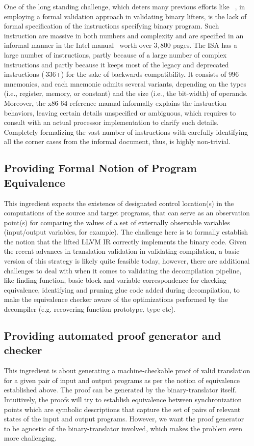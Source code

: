 One of the long standing challenge, which deters many previous efforts like
~\cite{ASE2017}, in employing a formal validation approach in validating
binary lifters, is the lack of formal specification of the \ISA instructions
specifying binary program. Such instruction are massive in both numbers and
complexity and are specified in an informal manner in the Intel
manual~\cite{IntelManual} worth over $3,800$ pages. The \ISA ISA has a large
number of instructions, partly because of a large number of complex
instructions and partly because it keeps most of the legacy and deprecated
instructions ($~336$+) for the sake of backwards compatibility. It consists of
$996$ mnemonics, and each mnemonic admits several variants, depending on the
types (i.e., register, memory, or constant) and the size (i.e., the bit-width)
  of operands. Moreover, the x86-64 reference manual informally explains the
  instruction behaviors, leaving certain details unspecified or ambiguous,
  which requires  to consult with an actual processor implementation to clarify
  such details. Completely formalizing the vast number of instructions with
  carefully identifying all the corner cases from the informal document, thus,
  is highly non-trivial.

\subsection{Providing Formal Notion of Program Equivalence} This ingredient
expects the existence of designated control location(s) in the computations
of the source and target programs, that can serve as an observation point(s)
  for comparing the values of a set of externally observable variables
  (input/output variables, for example). The challenge here is to formally
  establish the notion that the lifted LLVM IR  correctly implements the \ISA
  binary code. Given the recent advances in translation validation in
  validating compilation, a basic version of this strategy is likely quite
  feasible today, however, there are additional challenges to deal with when it
  comes to validating the decompilation pipeline, like finding function, basic
  block and variable correspondence for checking equivalence, identifying and
  pruning glue code added during decompilation, to make the equivalence checker
  aware of the optimizations performed by the decompiler (e.g.  recovering
      function prototype, type etc).

\subsection{Providing automated proof generator and checker} This ingredient is about
 generating a machine-checkable proof  of valid translation for a given pair
of input and output programs as per the notion of equivalence established
above. The proof can be generated by  the binary-translator itself.
Intuitively, the proofs will try to establish equivalence between
synchronization points which are symbolic descriptions that capture the set of
pairs of relevant states of the input and output programs. However, we want 
the proof generator to be agnostic of the binary-translator involved, which 
makes the problem  even more challenging.   


